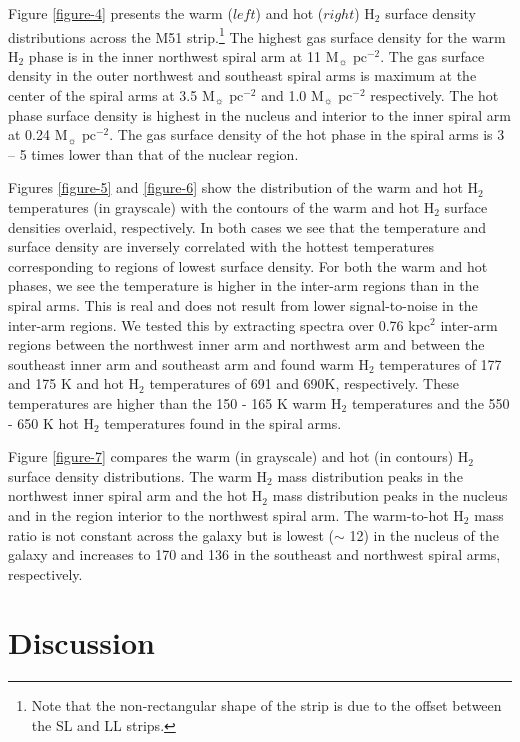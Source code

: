 \documentclass[12pt,preprint]{aastex}
\begin{document}
Figure \ref{figure-4} presents the warm ($left$) and hot ($right$)
H$_2$ surface density distributions across the M51 
strip.\footnote{Note that the non-rectangular shape of the strip 
is due to the offset between the SL and LL strips.}  The highest 
gas surface density for the warm H$_2$ phase is in 
the inner northwest spiral arm at 11 $\mathrm{M_\sun}$ 
$\mathrm{pc^{-2}}$. The gas surface density in the outer 
northwest and southeast spiral arms is maximum at the 
center of the spiral arms at 3.5 $\mathrm{M_\sun}$ 
$\mathrm{pc^{-2}}$ and 1.0 $\mathrm{M_\sun}$ $\mathrm{pc^{-2}}$ 
respectively.  The hot phase surface density is highest in 
the nucleus and interior to the inner spiral arm at 0.24 
$\mathrm{M_\sun}$ $\mathrm{pc^{-2}}$.  The gas surface 
density of the hot phase in the spiral arms is 3 -- 5 times 
lower than that of the nuclear region.

Figures \ref{figure-5} and \ref{figure-6} show the distribution 
of the warm and hot H$_2$ temperatures (in grayscale) with 
the contours of the warm and hot H$_2$ surface densities overlaid, respectively.  In 
both cases we see that the temperature and surface density 
are inversely correlated with the hottest temperatures 
corresponding to regions of lowest surface density.  For 
both the warm and hot phases, we see the temperature 
is higher in the inter-arm regions than in the spiral arms. 
This is real and does not result from lower signal-to-noise 
in the inter-arm regions.   We tested this by extracting spectra 
over 0.76 kpc$^2$ inter-arm regions between the northwest inner arm and northwest 
arm and between the southeast inner arm and southeast arm and found warm H$_2$ 
temperatures of 177 and 175 K and hot H$_2$ temperatures 
of 691 and 690K, respectively.  These temperatures are higher 
than the 150 - 165 K warm H$_2$ temperatures and the 550 - 650 
K hot H$_2$ temperatures found in the spiral arms.

Figure \ref{figure-7} compares the warm (in grayscale) 
and hot (in contours) H$_2$ surface density distributions.   
The warm H$_2$ mass distribution peaks
in the northwest inner spiral arm and the hot H$_2$ 
mass distribution peaks in the nucleus and in the 
region interior to the northwest spiral arm.  The warm-to-hot 
H$_2$ mass ratio is not constant across 
the galaxy but is lowest ($\sim$ 12) in the nucleus of the 
galaxy and increases to 170 and 136 in the southeast 
and northwest spiral arms, respectively.

\section{Discussion}
\end{document}
